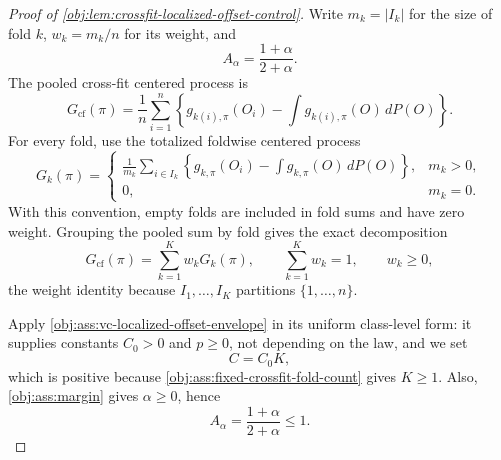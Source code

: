 \documentclass[11pt]{article}
\begin{document}
\begin{proof}[Proof of \cref{obj:lem:crossfit-localized-offset-control}]
Write \(m_k=|I_k|\) for the size of fold \(k\), \(w_k=m_k/n\) for its weight, and
\[
A_\alpha=\frac{1+\alpha}{2+\alpha}.
\]
The pooled cross-fit centered process is
\[
G_{\mathrm{cf}}(\pi)
=
\frac1n\sum_{i=1}^n\left\{g_{k(i),\pi}(O_i)-\int g_{k(i),\pi}(O)\,dP(O)\right\}.
\]
For every fold, use the totalized foldwise centered process
\[
G_k(\pi)=
\begin{cases}
\displaystyle
\frac1{m_k}\sum_{i\in I_k}\left\{g_{k,\pi}(O_i)-\int g_{k,\pi}(O)\,dP(O)\right\}, & m_k>0,\\[1.2ex]
0, & m_k=0.
\end{cases}
\]
With this convention, empty folds are included in fold sums and have zero weight. Grouping the pooled sum by fold gives the exact decomposition
\[
G_{\mathrm{cf}}(\pi)=\sum_{k=1}^K w_kG_k(\pi),
\qquad
\sum_{k=1}^K w_k=1,
\qquad
w_k\ge0,
\]
the weight identity because \(I_1,\ldots,I_K\) partitions \(\{1,\ldots,n\}\). %

Apply \cref{obj:ass:vc-localized-offset-envelope} in its uniform class-level form: it supplies constants \(C_0>0\) and \(p\ge0\), not depending on the law, and we set
\[
C=C_0K,
\]
which is positive because \cref{obj:ass:fixed-crossfit-fold-count} gives \(K\ge1\). %
Also, \cref{obj:ass:margin} gives \(\alpha\ge0\), hence
\[
A_\alpha=\frac{1+\alpha}{2+\alpha}\le1 .
\]


\end{proof}
\end{document}
